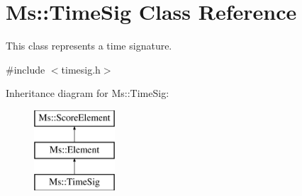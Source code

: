 \hypertarget{class_ms_1_1_time_sig}{}\section{Ms\+:\+:Time\+Sig Class Reference}
\label{class_ms_1_1_time_sig}


This class represents a time signature.  




{\ttfamily \#include $<$timesig.\+h$>$}

Inheritance diagram for Ms\+:\+:Time\+Sig\+:\begin{figure}[H]
\begin{center}
\leavevmode
\includegraphics[height=3.000000cm]{class_ms_1_1_time_sig}
\end{center}
\end{figure}
